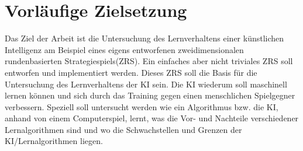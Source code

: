 \documentclass[12pt,a4paper]{scrartcl}
\begin{document}
\section*{Vorläufige Zielsetzung}
Das Ziel der Arbeit ist die Untersuchung des Lernverhaltens einer künstlichen Intelligenz am Beispiel eines eigens entworfenen zweidimensionalen rundenbasierten Strategiespiels(ZRS). Ein einfaches aber nicht triviales ZRS soll entworfen und implementiert werden. Dieses ZRS soll die Basis für die Untersuchung des Lernverhaltens der KI sein. Die KI wiederum soll maschinell lernen können und sich durch das Training gegen einen menschlichen Spielgegner verbessern. Speziell soll untersucht werden wie ein Algorithmus bzw. die KI, anhand von einem Computerspiel, lernt, was die Vor- und Nachteile verschiedener Lernalgorithmen sind und wo die Schwachstellen und Grenzen der KI/Lernalgorithmen liegen. 
\end{document}
